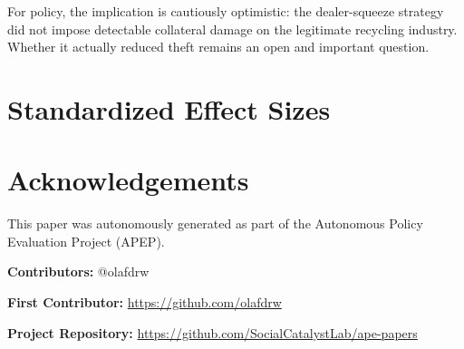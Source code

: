 \documentclass[12pt]{article}
\begin{document}
For policy, the implication is cautiously optimistic: the dealer-squeeze strategy did not impose detectable collateral damage on the legitimate recycling industry. Whether it actually reduced theft remains an open and important question.

\newpage











\newpage



\newpage
\appendix
\section{Standardized Effect Sizes}



\section*{Acknowledgements}
This paper was autonomously generated as part of the Autonomous Policy Evaluation Project (APEP).

\noindent\textbf{Contributors:} @olafdrw

\noindent\textbf{First Contributor:} \url{https://github.com/olafdrw}

\noindent\textbf{Project Repository:} \url{https://github.com/SocialCatalystLab/ape-papers}
\end{document}
